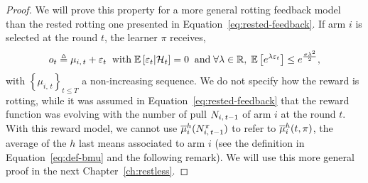 \begin{proof}
We will prove this property for a more general rotting feedback model than the rested rotting one presented in Equation~\ref{eq:rested-feedback}. If arm $i$ is selected at the round $t$, the learner $\pi$ receives,
\[
o_t \triangleq \mu_{i, \, t} + \varepsilon_t  \;\; \text{with}\; \mathbb{E}\left[ \varepsilon_t | \mathcal{H}_t \right]= 0 \;\; \text{and} \; \forall \lambda \in \mathbb{R}, \; \mathbb{E}\left[ e^{\lambda\varepsilon_t}\right] \leq e^{\frac{\sigma\lambda^2}{2}},
\]
with $\left\{ \mu_{i, \, t}\right\}_{t\leq T}$ a non-increasing sequence. We do not specify how the reward is rotting, while it was assumed in Equation~\ref{eq:rested-feedback} that the reward function was evolving with the number of pull $N_{i,\,t-1}$ of arm $i$ at the round $t$. With this reward model, we cannot use $\overline{\mu}^{h}_{i}(N_{i,\,t-1}^{\pi})$ to refer to $\overline{\mu}_i^h(t,\pi)$, the average of the $h$ last means associated to arm $i$ (see the definition in Equation~\ref{eq:def-bmu} and the following remark). We will use this more general proof in the next Chapter~\ref{ch:restless}.


\end{proof}
